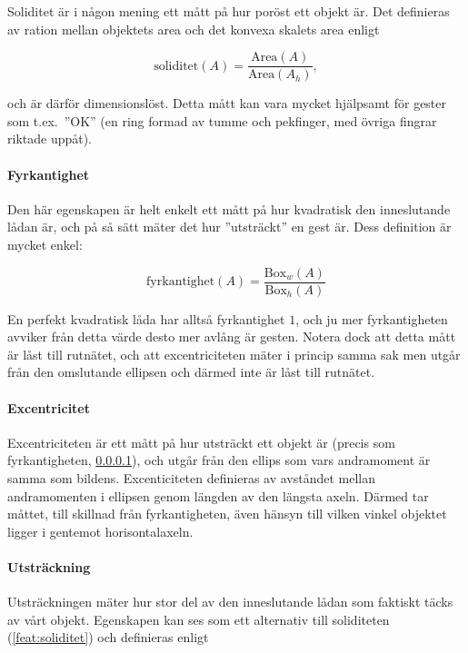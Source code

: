 \documentclass[../rapport_MVEX01-11-05]{subfiles}
\begin{document}
Soliditet är i någon mening ett mått på hur poröst ett objekt är. Det
definieras av ration mellan objektets area och det konvexa skalets
area enligt

\begin{equation*}
  \textrm{soliditet}(A) = \frac{\textrm{Area}(A)}{\textrm{Area}(A_h)},
\end{equation*}

och är därför dimensionslöst. Detta mått kan vara mycket hjälpsamt för
gester som t.ex.~''OK'' (en ring formad av tumme och pekfinger, med
övriga fingrar riktade uppåt).

\paragraph{Fyrkantighet}
\label{feat:fyrkantighet}

Den här egenskapen är helt enkelt ett mått på hur kvadratisk den
inneslutande lådan är, och på så sätt mäter det hur ''utsträckt'' en
gest är. Dess definition är mycket enkel:

\begin{equation*}
  \textrm{fyrkantighet}(A) = \frac{\textrm{Box}_w(A)}{\textrm{Box}_h(A)}
\end{equation*}

En perfekt kvadratisk låda har alltså fyrkantighet $1$, och ju mer
fyrkantigheten avviker från detta värde desto mer avlång är gesten.
Notera dock att detta mått är låst till rutnätet, och att
excentriciteten mäter i princip samma sak men utgår från den
omslutande ellipsen och därmed inte är låst till rutnätet.

\paragraph{Excentricitet}

Excentriciteten är ett mått på hur utsträckt ett objekt är (precis som
fyrkantigheten, \ref{feat:fyrkantighet}), och utgår från den ellips som
vars andramoment är samma som bildens. Excenticiteten definieras av avståndet
mellan andramomenten i ellipsen genom längden av den längsta axeln. Därmed
tar måttet, till skillnad från fyrkantigheten, även hänsyn till vilken vinkel
objektet ligger i gentemot horisontalaxeln.

\paragraph{Utsträckning}

Utsträckningen mäter hur stor del av den inneslutande lådan som
faktiskt täcks av vårt objekt. Egenskapen kan ses som ett alternativ
till soliditeten (\ref{feat:soliditet}) och definieras enligt
\end{document}
